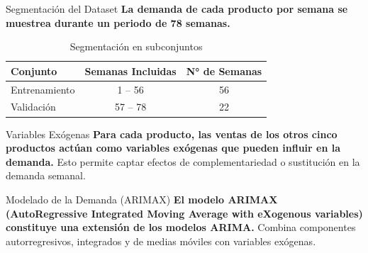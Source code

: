\documentclass{beamer}
\begin{document}
\begin{frame}{Segmentación del Dataset}
  \vspace{0.3cm}
  \textbf{La demanda de cada producto por semana se muestrea durante un periodo de 78 semanas.}
  \vspace{0.5cm}
  \begin{table}[]
    \centering
    \caption{Segmentación en subconjuntos}
    \renewcommand{\arraystretch}{1.3}
    \begin{tabular}{|l|c|c|}
    \hline
    Conjunto & Semanas Incluidas & N° de Semanas \\ \hline
    Entrenamiento & 1 – 56 & 56 \\ \hline
    Validación & 57 – 78 & 22 \\ \hline
    \end{tabular}
  \end{table}
\end{frame}

\begin{frame}{Variables Exógenas}
  \vspace{0.3cm}
  \textbf{Para cada producto, las ventas de los otros cinco productos actúan como variables exógenas que pueden influir en la demanda.}
  \vspace{0.3cm}
  Esto permite captar efectos de complementariedad o sustitución en la demanda semanal.
\end{frame}

\begin{frame}{Modelado de la Demanda (ARIMAX)}
  \vspace{0.3cm}
  \textbf{El modelo ARIMAX (AutoRegressive Integrated Moving Average with eXogenous variables) constituye una extensión de los modelos ARIMA.}
  \vspace{0.3cm}
  Combina componentes autorregresivos, integrados y de medias móviles con variables exógenas.
\end{frame}
\end{document}

